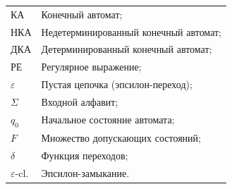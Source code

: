 \label{sec:reduction}

\noindent
\begin{tabular}{@{}p{2.4cm}@{\ \mdash\ }p{12.2cm}@{}}
КА & Конечный автомат;\\
НКА & Недетерминированный конечный автомат;\\
ДКА & Детерминированный конечный автомат;\\
РЕ & Регулярное выражение;\\
$\varepsilon$ & Пустая цепочка (эпсилон-переход);\\
$\Sigma$ & Входной алфавит;\\
$q_{0}$ & Начальное состояние автомата;\\
$F$ & Множество допускающих состояний;\\
$\delta$ & Функция переходов;\\
$\varepsilon$-cl. & Эпсилон-замыкание.
\end{tabular}
